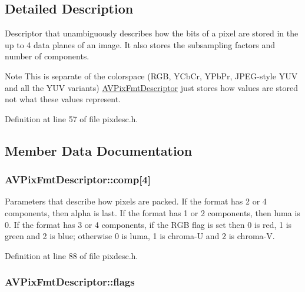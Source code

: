 \subsection{Detailed Description}
Descriptor that unambiguously describes how the bits of a pixel are stored in the up to 4 data planes of an image. It also stores the subsampling factors and number of components.

\begin{DoxyNote}{Note}
This is separate of the colorspace (R\+GB, Y\+Cb\+Cr, Y\+Pb\+Pr, J\+P\+E\+G-\/style Y\+UV and all the Y\+UV variants) \hyperlink{struct_a_v_pix_fmt_descriptor}{A\+V\+Pix\+Fmt\+Descriptor} just stores how values are stored not what these values represent. 
\end{DoxyNote}


Definition at line 57 of file pixdesc.\+h.



\subsection{Member Data Documentation}
\subsubsection[{\texorpdfstring{comp}{comp}}]{ A\+V\+Pix\+Fmt\+Descriptor\+::comp\mbox{[}4\mbox{]}}\hypertarget{struct_a_v_pix_fmt_descriptor_a17569c9349766c3b5201b33f84f19a25}{}\label{struct_a_v_pix_fmt_descriptor_a17569c9349766c3b5201b33f84f19a25}
Parameters that describe how pixels are packed. If the format has 2 or 4 components, then alpha is last. If the format has 1 or 2 components, then luma is 0. If the format has 3 or 4 components, if the R\+GB flag is set then 0 is red, 1 is green and 2 is blue; otherwise 0 is luma, 1 is chroma-\/U and 2 is chroma-\/V. 

Definition at line 88 of file pixdesc.\+h.

\subsubsection[{\texorpdfstring{flags}{flags}}]{ A\+V\+Pix\+Fmt\+Descriptor\+::flags}\hypertarget{struct_a_v_pix_fmt_descriptor_a6da04fdde7dcfd348dede45c6a68c229}{}\label{struct_a_v_pix_fmt_descriptor_a6da04fdde7dcfd348dede45c6a68c229}



